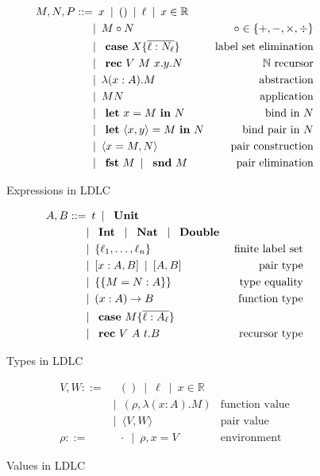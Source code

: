 \begin{figure}
\begin{align*}
 M,N,P ::=
    & \enspace x \enspace|\enspace
      () \enspace|\enspace
      \ell \enspace|\enspace
      x \in \mathbb{R} \\
    & |\enspace M \circ N & \circ \in \{+,-,\times,\div\} \\
    & |\enspace \text{ \textbf{case} } X \{\overline{\ell : N_\ell}\} & \text{label set elimination} \\
    & |\enspace \text{ \textbf{rec} } V~M~x.y.N & \mathbb{N}\text{ recursor} \\
    & |\enspace \lambda (x : A).M & \text{abstraction} \\
    & |\enspace M N & \text{application}\\
    & |\enspace \text{ \textbf{let} } x = M \text{ \textbf{in} } N & \text{bind in $N$}\\
    & |\enspace \text{ \textbf{let} } \langle x, y \rangle = M \text{ \textbf{in} } N & \text{bind pair in $N$} \\
    & |\enspace \langle x = M, N \rangle & \text{pair construction}\\
    & |\enspace \text{ \textbf{fst} } M \enspace|\enspace \text{ \textbf{snd} } M & \text{pair elimination}
\end{align*}
\caption{Expressions in LDLC}
\label{fig:ldlc-expressions}
\end{figure}

\begin{figure}
\begin{align*}
 A, B ::=
    & \enspace t \enspace|\enspace
      \text{ \textbf{Unit} }
    \\ &  |\enspace \text{ \textbf{Int} } \enspace|\enspace
      \text{ \textbf{Nat} } \enspace|\enspace
      \text{ \textbf{Double} } \\
    & |\enspace \{ \ell_1, \dots, \ell_n \} & \text{finite label set} \\
    & |\enspace [x:A,B] \enspace|\enspace [A,B] & \text{pair type} \\
    & |\enspace \{\{ M = N : A \}\} & \text{type equality} \\
    & |\enspace (x:A) \rightarrow B & \text{function type} \\
    & |\enspace \text{ \textbf{case} } M \{\overline{\ell : A_\ell}\} \\
    & |\enspace \text{ \textbf{rec} } V~A~t.B & \text{recursor type}
\end{align*}
\caption{Types in LDLC}
\label{fig:ldlc-types}
\end{figure}

\begin{figure}
\begin{align*}
    V, W ::=
    & \enspace () \enspace|\enspace
      \ell \enspace|\enspace
      x \in \mathbb{R} \\
    & |\enspace (\rho, \lambda (x:A).M) & \text{function value} \\
    & |\enspace \langle V, W \rangle & \text{pair value} \\
    \rho ::= & \enspace \cdot \enspace | \enspace \rho, x = V & \text{environment}
\end{align*}
\caption{Values in LDLC}
\label{fig:ldlc-values}
\end{figure}

